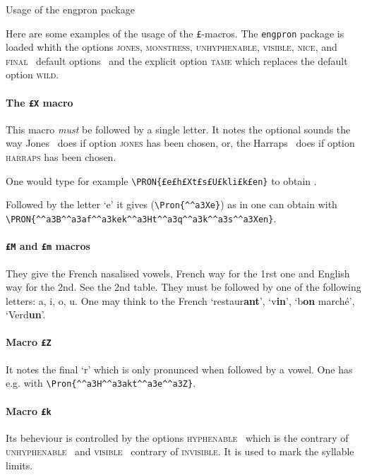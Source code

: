 \documentclass[a4paper]{article}
\newcommand{\TO}{\textemdash\ \ignorespaces}
\newcommand{\TF}{\unskip\ \textemdash\xspace}
\newcommand\Pkg[1]{\textsf{#1}}
\newcommand\Option[1]{\textsc{#1}}
\begin{document}
\begin{center}\LARGE
 Usage of the \Pkg{engpron} package
\end{center}
Here are some examples of the usage of the \texttt{^^a3}-macros. The
\verb+engpron+ package is loaded whith the options \Option{jones},
\Option{monstress}, \Option{unhyphenable}, \Option{visible},
\Option{nice}, and \Option{final} \TO default options\TF and the
explicit option \Option{tame} which replaces the default option
\Option{wild}.
\paragraph{The \texttt{^^a3X} macro} This macro \emph{must} be
followed by a single letter. It notes the optional sounds the way
Jones~\cite{jones15} does if option \Option{jones} has been chosen,
or,  the Harraps~\cite{harraps} does if option \Option{harraps} has
been chosen.

One would type for example
\verb!\PRON{!\texttt{^^a3e^^a3h^^a3Xt^^a3s^^a3U^^a3kli^^a3k^^a3en}\verb!}!
to obtain .

Followed by the letter `e' it gives 
(\verb+\Pron{^^a3Xe}+) as in  one can
obtain with \verb+\PRON{^^a3B^^a3af^^a3kek^^a3Ht^^a3q^^a3k^^a3s^^a3Xen}+.
\paragraph{\texttt{^^a3M} and \texttt{^^a3m} macros} They give the French
nasalised vowels, French way for the 1rst one and English way for the
2nd. See the 2nd table. They must be followed by one of the following
letters: a, i, o, u. One may think to the French
`restaur\textbf{ant}', `v\textbf{in}', `b\textbf{on} march^^e9',
`Verd\textbf{un}'.
\paragraph{Macro \texttt{^^a3Z}} It notes the final `r' which is only
pronunced when followed by a vowel. One has e.g.  with
\verb+\Pron{^^a3H^^a3akt^^a3e^^a3Z}+.
\paragraph{Macro \texttt{^^a3k}} Its beheviour is controlled by the
options \Option{hyphenable} \TO which is the contrary of
\Option{unhyphenable}\TF and \Option{visible} \TO contrary of
\Option{invisible}. It is used to mark the syllable limits.
\end{document}
